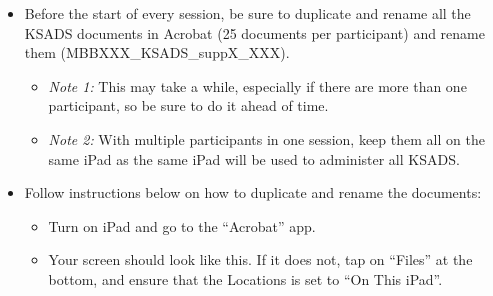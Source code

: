 \documentclass[]{book}
\providecommand{\tightlist}{%
  \setlength{\itemsep}{0pt}\setlength{\parskip}{0pt}}
\begin{document}
\begin{itemize}
\tightlist
\item
  Before the start of every session, be sure to duplicate and rename all the KSADS documents in Acrobat (25 documents per participant) and rename them (MBBXXX\_KSADS\_suppX\_XXX).

  \begin{itemize}
  \tightlist
  \item
    \emph{Note 1:} This may take a while, especially if there are more than one participant, so be sure to do it ahead of time.
  \item
    \emph{Note 2:} With multiple participants in one session, keep them all on the same iPad as the same iPad will be used to administer all KSADS.
  \end{itemize}
\item
  Follow instructions below on how to duplicate and rename the documents:

  \begin{itemize}
  \item
    Turn on iPad and go to the ``Acrobat'' app.
  \item
    Your screen should look like this. If it does not, tap on ``Files'' at the bottom, and ensure that the Locations is set to ``On This iPad''.


\end{itemize}
\end{itemize}
\end{document}
